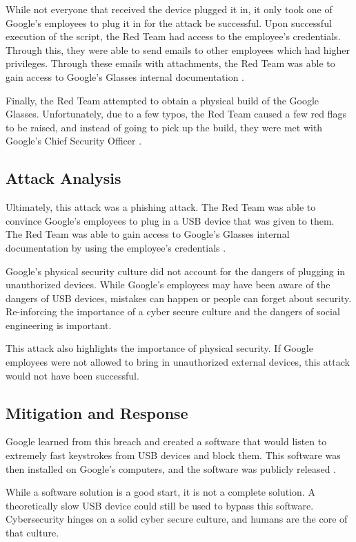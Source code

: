 \documentclass[acmsmall]{acmart}
\begin{document}
While not everyone that received the device plugged it in, it only took one of
Google's employees to plug it in for the attack be successful. Upon successful
execution of the script, the Red Team had access to the employee's credentials.
Through this, they were able to send emails to other employees which had higher
privileges. Through these emails with attachments, the Red Team was able to
gain access to Google's Glasses internal documentation \cite{GoogleGlobeVideo}.

Finally, the Red Team attempted to obtain a physical build of the Google Glasses.
Unfortunately, due to a few typos, the Red Team caused a few red flags to be raised,
and instead of going to pick up the build, they were met with Google's Chief Security
Officer \cite{GoogleGlobeVideo}.

\subsection{Attack Analysis}
Ultimately, this attack was a phishing attack. The Red Team was able to convince
Google's employees to plug in a USB device that was given to them. The Red Team
was able to gain access to Google's Glasses internal documentation by using the
employee's credentials \cite{GoogleGlobeVideo}.

Google's physical security culture did not account for the dangers of plugging in
unauthorized devices. While Google's employees may have been aware of the dangers
of USB devices, mistakes can happen or people can forget about security.
Re-inforcing the importance of a cyber secure culture and the dangers of social
engineering is important.

This attack also highlights the importance of physical security. If Google employees
were not allowed to bring in unauthorized external devices, this attack would not
have been successful.

\subsection{Mitigation and Response}
Google learned from this breach and created a software that would listen to extremely
fast keystrokes from USB devices and block them. This software was then installed
on Google's computers, and the software was publicly released \cite{GoogleUSB,GoogleRedTeamBlog}.

While a software solution is a good start, it is not a complete solution. A theoretically
slow USB device could still be used to bypass this software. Cybersecurity hinges
on a solid cyber secure culture, and humans are the core of that culture. 
\end{document}
